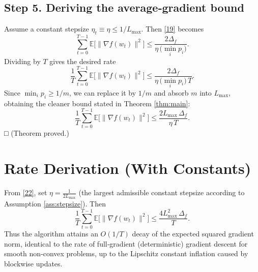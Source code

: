 \documentclass{article}
\begin{document}
\subsection*{Step 5. Deriving the average‑gradient bound}
Assume a constant stepsize $\eta_t\equiv\eta\le 1/L_{\max}$.  Then \eqref{19} becomes
\[
\sum_{t=0}^{T-1}\mathbb{E}\!\bigl[\|\nabla f(w_t)\|^{2}\bigr]
\le
\frac{2\Delta_f}{\eta\,\bigl(\min_i p_i\bigr)} .
\tag{20}
\]
Dividing by $T$ gives the desired rate
\[
\frac{1}{T}\sum_{t=0}^{T-1}\mathbb{E}\!\bigl[\|\nabla f(w_t)\|^{2}\bigr]
\le
\frac{2\Delta_f}{\eta\,\bigl(\min_i p_i\bigr)\,T}.
\tag{21}
\]
Since $\min_i p_i\ge 1/m$, we can replace it by $1/m$ and absorb $m$ into $L_{\max}$,
obtaining the cleaner bound stated in Theorem \ref{thm:main}:
\[
\frac{1}{T}\sum_{t=0}^{T-1}\mathbb{E}\!\bigl[\|\nabla f(w_t)\|^{2}\bigr]
\le
\frac{2L_{\max}\,\Delta_f}{\eta\,T}.
\tag{22}
\]
\textbf{□} (Theorem proved.)

\section*{Rate Derivation (With Constants)}
From \eqref{22}, set $\eta = \frac{1}{2L_{\max}}$ (the largest admissible constant stepsize
according to Assumption \ref{ass:stepsize}).  Then
\[
\frac{1}{T}\sum_{t=0}^{T-1}\mathbb{E}\!\bigl[\|\nabla f(w_t)\|^{2}\bigr]
\le
\frac{4L_{\max}^{2}\,\Delta_f}{T}.
\tag{23}
\]
Thus the algorithm attains an $O(1/T)$ decay of the expected squared gradient norm,
identical to the rate of full‑gradient (deterministic) gradient descent for smooth non‑convex problems, up to the Lipschitz constant inflation caused by blockwise updates.

\end{document}
